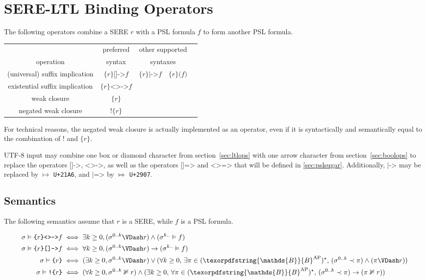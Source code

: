 \documentclass[a4paper,twoside,10pt,DIV=12]{scrreprt}
\newcommand{\uni}[1]{\texttt{\small U+#1}}
\newcommand{\B}{\texorpdfstring{\ensuremath{\mathds{B}}}{B}}
\newcommand{\AP}{\ensuremath{\mathrm{AP}}}
\DeclareMathOperator{\NOT}{\texttt{!}}
\newcommand{\0}{\texttt{0}}
\newcommand{\1}{\texttt{1}}
\newcommand{\Esuffix}{\texttt{<>->}}
\newcommand{\Asuffix}{\texttt{[]->}}
\newcommand{\AsuffixALT}{\texttt{|->}}
\newcommand{\EsuffixEQ}{\texttt{<>=>}}
\newcommand{\AsuffixEQ}{\texttt{[]=>}}
\newcommand{\AsuffixALTEQ}{\texttt{|=>}}
\newcommand{\sere}[1]{\texttt{\{}#1\texttt{\}}}
\newcommand{\nsere}[1]{\texttt{!\{}#1\texttt{\}}}
\def\limplies{\rightarrow}
\begin{document}
\section{SERE-LTL Binding Operators}

The following operators combine a SERE $r$ with a PSL
formula $f$ to form another PSL formula.

\begin{center}
\begin{tabular}{ccccc}
              & preferred & \multicolumn{2}{c}{other supported} \\
   operation  & syntax    & \multicolumn{2}{c}{syntaxes}\\
  \midrule
  (universal) suffix implication
  & $\sere{r}\Asuffix{} f$
  & $\sere{r}\AsuffixALT{} f$
  & $\sere{r}\texttt{(}f\texttt{)}$
  \\
  existential suffix implication
  & $\sere{r}\Esuffix{} f$
  \\
  weak closure
  & $\sere{r}$
  \\
  negated weak closure
  & $\nsere{r}$
  \\
\end{tabular}
\end{center}

For technical reasons, the negated weak closure is actually implemented as
an operator, even if it is syntactically and semantically equal to the
combination of $\NOT$ and $\sere{r}$.

UTF-8 input may combine one box or diamond character from
section~\ref{sec:ltlops} with one arrow character from
section~\ref{sec:boolops} to replace the operators $\Asuffix$,
$\Esuffix$, as well as the operators $\AsuffixEQ$ and $\EsuffixEQ$
that will be defined in \ref{sec:pslsugar}.  Additionally,
$\AsuffixALT$ may be replaced by $\mapsto$ \uni{21A6}, and
$\AsuffixALTEQ$ by $\Mapsto$ \uni{2907}.

\subsection{Semantics}

The following semantics assume that $r$ is a SERE,
while $f$ is a PSL formula.

\begin{align*}
  \sigma\vDash \sere{r}\Esuffix f &\iff \exists k\ge 0, (\sigma^{0..k}\VDash r)\land(\sigma^{k..}\vDash f)\\
  \sigma\vDash \sere{r}\Asuffix f &\iff \forall k\ge 0, (\sigma^{0..k}\VDash r)\limplies (\sigma^{k..}\vDash f)\\
  \sigma\vDash \sere{r} & \iff (\exists k\ge 0, \sigma^{0..k}\VDash r)\lor(\forall k\ge 0,\,\exists\pi\in(\B^\AP)^\star,\, (\sigma^{0..k}\prec \pi)\land(\pi\VDash r))\\
  \sigma\vDash \nsere{r} & \iff (\forall k\ge 0, \sigma^{0..k}\nVDash r)\land(\exists k\ge 0,\,\forall\pi\in(\B^\AP)^\star,\, (\sigma^{0..k}\prec \pi)\limplies(\pi\nVDash r))\\
\end{align*}
\end{document}
